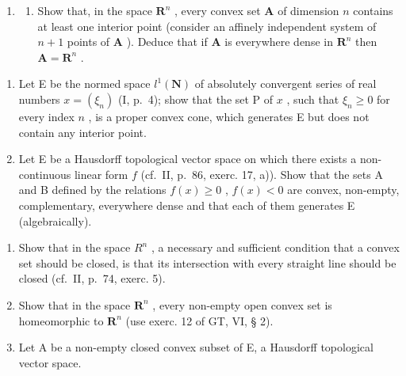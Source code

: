\begin{enumerate}
\def\labelenumi{\arabic{enumi})}
\setcounter{enumi}{10}
\tightlist
\item
  \begin{enumerate}
  \def\labelenumii{\alph{enumii})}
  \tightlist
  \item
    Show that, in the space \(\mathbf{R}^n\) , every convex set \(\mathbf{A}\) of dimension \(n\) contains at least one interior point (consider an affinely independent system of \(n + 1\) points of \(\mathbf{A}\) ). Deduce that if \(\mathbf{A}\) is everywhere dense in \(\mathbf{R}^n\) then \(\mathbf{A} = \mathbf{R}^n\) .
  \end{enumerate}
\end{enumerate}

\begin{enumerate}
\def\labelenumi{\alph{enumi})}
\setcounter{enumi}{1}
\item
  Let E be the normed space \(l^1(\mathbf{N})\) of absolutely convergent series of real numbers \(x = (\xi_n)\) (I, p.~4); show that the set P of \(x\) , such that \(\xi_n \geqslant 0\) for every index \(n\) , is a proper convex cone, which generates E but does not contain any interior point.
\item
  Let E be a Hausdorff topological vector space on which there exists a non-continuous linear form \(f\) (cf.~II, p.~86, exerc. 17, a)). Show that the sets A and B defined by the relations \(f(x) \geqslant 0\) , \(f(x) < 0\) are convex, non-empty, complementary, everywhere dense and that each of them generates E (algebraically).
\end{enumerate}

\begin{enumerate}
\def\labelenumi{\arabic{enumi})}
\setcounter{enumi}{11}
\item
  Show that in the space \(R^{n}\) , a necessary and sufficient condition that a convex set should be closed, is that its intersection with every straight line should be closed (cf.~II, p.~74, exerc. 5).
\item
  Show that in the space \(\mathbf{R}^n\) , every non-empty open convex set is homeomorphic to \(\mathbf{R}^n\) (use exerc. 12 of GT, VI, § 2).
\item
  Let A be a non-empty closed convex subset of E, a Hausdorff topological vector space.
\end{enumerate}

